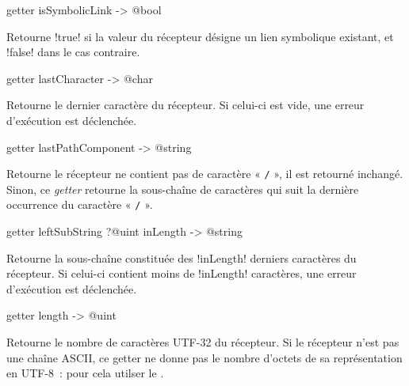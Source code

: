 \begin{galgasbox}
getter isSymbolicLink -> @bool
\end{galgasbox}

Retourne \ggs!true! si la valeur du récepteur désigne un lien symbolique existant, et \ggs!false! dans le cas contraire.









\begin{galgasbox}
getter lastCharacter -> @char
\end{galgasbox}

Retourne le dernier caractère du récepteur. Si celui-ci est vide, une erreur d'exécution est déclenchée.









\begin{galgasbox}
getter lastPathComponent -> @string
\end{galgasbox}

Retourne le récepteur ne contient pas de caractère « \texttt{/} », il est retourné inchangé. Sinon, ce \emph{getter} retourne la sous-chaîne de caractères qui suit la dernière occurrence du caractère « \texttt{/} ».









\begin{galgasbox}
getter leftSubString ?@uint inLength -> @string
\end{galgasbox}

Retourne la sous-chaîne constituée des \ggs!inLength! derniers caractères du récepteur. Si celui-ci contient moins de \ggs!inLength! caractères, une erreur d'exécution est déclenchée.









\begin{galgasbox}
getter length -> @uint
\end{galgasbox}

Retourne le nombre de caractères UTF-32 du récepteur. Si le récepteur n'est pas une chaîne ASCII, ce getter ne donne pas le nombre d'octets de sa représentation en UTF-8~: pour cela utilser le .








